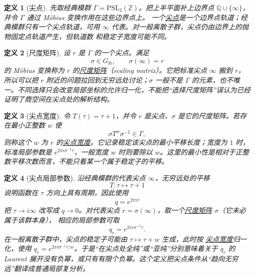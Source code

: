 \documentclass[UTF8,fontset=none,a4paper,11pt]{ctexart}
\theoremstyle{foundation-definition}
\newtheorem{definition}{定义}[section]
\theoremstyle{foundation-theorem}
\theoremstyle{foundation-proposition}
\theoremstyle{foundation-example}
\theoremstyle{foundation-remark}
\theoremstyle{foundation-theorem}
\newcommand{\term}[2]{\hyperref[#1]{#2}}
\begin{document}
\begin{definition}[尖点]\label{def:cusp}
先取经典模群 \(\Gamma=\mathrm{PSL}_2(\mathbb Z)\)。把上半平面补上边界点
\(\mathbb Q\cup\{\infty\}\)，并令 \(\Gamma\) 通过 Möbius 变换作用在这些边界点上。
一个\term{def:cusp}{尖点}是一个边界点轨道；经典模群只有一个尖点轨道，可用
\(\infty\) 代表。对一般离散子群，尖点仍由边界上的抛物固定点轨道产生，但轨道数
和稳定子宽度可能不同。
\end{definition}

\begin{definition}[尺度矩阵]\label{def:scaling-matrix}
设 \(r\) 是 \(\Gamma\) 的一个尖点。满足
\[
\sigma\in G_{\mathfrak H},\qquad \sigma(\infty)=r
\]
的 Möbius 变换称为 \(r\) 的\term{def:scaling-matrix}{尺度矩阵}（scaling matrix）。它把标准尖点 \(\infty\) 搬到 \(r\)，所以可以把 \(r\) 附近的问题拉回到无穷远处讨论；\(\sigma\) 一般不是 \(\Gamma\) 的元素，也不唯一。不同选择只会改变局部坐标的允许归一化，不能把“选择尺度矩阵”误认为已经证明了商空间在尖点处的解析结构。
\end{definition}

\begin{definition}[尖点宽度]\label{def:cusp-width}
令 \(T(\tau)=\tau+1\)，并令 \(r\) 是尖点、\(\sigma\) 是它的尺度矩阵。若存在最小正整数 \(w\) 使
\[
\sigma T^w\sigma^{-1}\in\Gamma,
\]
则称这个 \(w\) 为 \(r\) 的\term{def:cusp-width}{尖点宽度}。它记录稳定该尖点的最小平移长度；宽度为 \(1\) 时，标准局部参数是 \(e^{2\pi i\sigma^{-1}\tau}\)，一般宽度 \(w\) 时则要除以 \(w\)。这里的最小性是相对于正整数平移次数而言，不能只看某一个属于稳定子的平移。
\end{definition}

\begin{definition}[尖点局部参数]\label{def:cusp-local-parameter}
沿经典模群的代表尖点 \(\infty\)，无穷远处的平移
\[
T:\tau\longmapsto\tau+1
\]
说明函数在 \(\tau\) 方向上具有周期，因此使用
\[
q=e^{2\pi i\tau}
\]
把 \(\tau\to i\infty\) 改写成 \(q\to0\)。对代表尖点
\(r=\sigma(\infty)\)，取一个\term{def:scaling-matrix}{尺度矩阵}
\(\sigma\)（它未必属于该群本身），
相应的局部参数可取
\[
q_r=e^{2\pi i\sigma^{-1}\tau}.
\]
在一般离散子群中，尖点的稳定子可能由 \(\tau\mapsto\tau+w\) 生成，此时按
\term{def:cusp-width}{尖点宽度}归一化，使用
\(q_r=e^{2\pi i\sigma^{-1}\tau/w}\)。于是“在尖点处全纯”或“亚纯”分别意味着关于 \(q_r\) 的 Laurent 展开没有负幂，或只有有限个负幂。这个定义把尖点条件从“趋向无穷远”翻译成普通局部复分析。
\end{definition}
\end{document}
